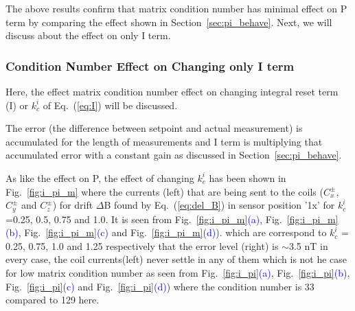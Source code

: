 \FloatBarrier
The above results confirm that matrix condition number has minimal effect on P term by comparing the effect shown in Section~\ref{sec:pi_behave}. Next, we will discuss about the effect on only I term.

\subsubsection{Condition Number Effect on Changing only I term}
Here, the effect matrix condition number effect on changing integral reset term (I) or $k_c^i$ of Eq.~(\ref{eq:I}) will be discussed.

The error (the difference between setpoint and actual measurement) is accumulated for the length of measurements and I term is multiplying that accumulated error  with a constant gain as discussed in Section~\ref{sec:pi_behave}.




As like the effect on P, the effect of changing $k_c^i$ has been shown in Fig.~\ref{fig:i_pi_m} where the currents (left) that are being sent to the coils ($C_x^\pm$, $C_y^\pm$ and $C_z^\pm$) for drift $\Delta$B found by Eq.~(\ref{eq:del_B}) in sensor position '1x' for $k_c^i$=0.25, 0.5, 0.75 and 1.0.  It is seen from Fig.~\ref{fig:i_pi_m}\textcolor{blue}{(a)}, Fig.~\ref{fig:i_pi_m}\textcolor{blue}{(b)}, Fig.~\ref{fig:i_pi_m}\textcolor{blue}{(c)} and Fig.~\ref{fig:i_pi_m}\textcolor{blue}{(d)}). which are correspond to $k_c^i$ = 0.25, 0.75, 1.0 and 1.25 respectively that the error level (right) is $\sim$3.5 nT in every case, the coil currents(left) never settle in any of them which is not he case for low matrix condition number as seen from Fig.~\ref{fig:i_pi}\textcolor{blue}{(a)}, Fig.~\ref{fig:i_pi}\textcolor{blue}{(b)}, Fig.~\ref{fig:i_pi}\textcolor{blue}{(c)} and Fig.~\ref{fig:i_pi}\textcolor{blue}{(d)}) where the condition number is 33 compared to 129 here.

